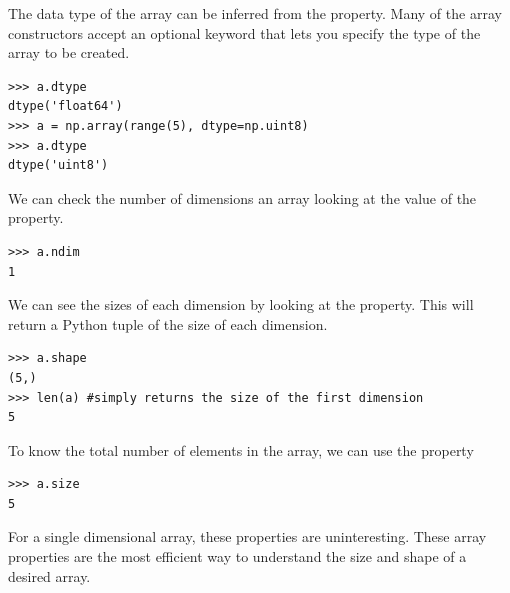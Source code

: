 The data type of the array can be inferred from the  property.
Many of the array constructors accept an optional  keyword that lets you specify the type of the array to be created.
\begin{lstlisting}
>>> a.dtype
dtype('float64')
>>> a = np.array(range(5), dtype=np.uint8)
>>> a.dtype
dtype('uint8')
\end{lstlisting}
We can check the number of dimensions an array looking at the value of the  property.
\begin{lstlisting}
>>> a.ndim
1
\end{lstlisting}
We can see the sizes of each dimension by looking at the  property.
This will return a Python tuple of the size of each dimension.
\begin{lstlisting}
>>> a.shape
(5,)
>>> len(a) #simply returns the size of the first dimension
5
\end{lstlisting}
To know the total number of elements in the array, we can use the  property
\begin{lstlisting}
>>> a.size
5
\end{lstlisting}
For a single dimensional array, these properties are uninteresting.
These array properties are the most efficient way to understand the size and shape of a desired array.


